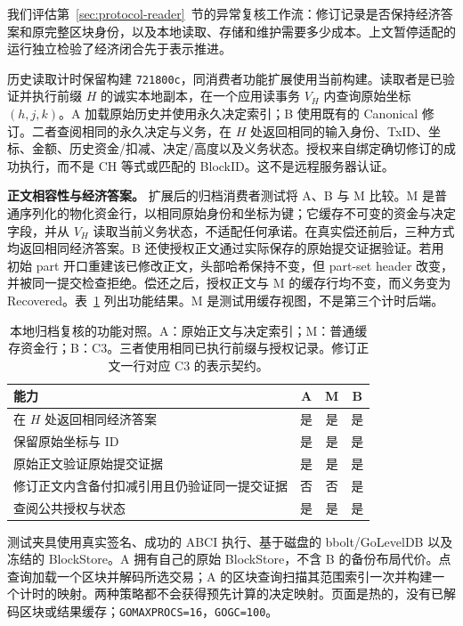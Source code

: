 我们评估第~\ref{sec:protocol-reader}~节的异常复核工作流：修订记录是否保持经济答案和原完整区块身份，以及本地读取、存储和维护需要多少成本。上文暂停适配的运行独立检验了经济闭合先于表示推进。

历史读取计时保留构建 \texttt{721800c}，同消费者功能扩展使用当前构建。读取者是已验证并执行前缀 $H$ 的诚实本地副本，在一个应用读事务 $V_H$ 内查询原始坐标 $(h,j,k)$。A 加载原始历史并使用永久决定索引；B 使用既有的 Canonical 修订。二者查阅相同的永久决定与义务，在 $H$ 处返回相同的输入身份、TxID、坐标、金额、历史资金/扣减、决定/高度以及义务状态。授权来自绑定确切修订的成功执行，而不是 CH 等式或匹配的 BlockID。这不是远程服务器认证。


\noindent\textbf{正文相容性与经济答案。}
扩展后的归档消费者测试将 A、B 与 M 比较。M 是普通序列化的物化资金行，以相同原始身份和坐标为键；它缓存不可变的资金与决定字段，并从 $V_H$ 读取当前义务状态，不适配任何承诺。在真实偿还前后，三种方式均返回相同经济答案。B 还使授权正文通过实际保存的原始提交证据验证。若用初始 part 开口重建该已修改正文，头部哈希保持不变，但 part-set header 改变，并被同一提交检查拒绝。偿还之后，授权正文与 M 的缓存行均不变，而义务变为 Recovered。表~\ref{tab:c3-function} 列出功能结果。M 是测试用缓存视图，不是第三个计时后端。

\begin{table}[t]
  \centering
  \caption{本地归档复核的功能对照。A：原始正文与决定索引；M：普通缓存资金行；B：C3。三者使用相同已执行前缀与授权记录。修订正文一行对应 C3 的表示契约。}
  \label{tab:c3-function}
  \small
  \begin{tabular}{@{}p{}ccc@{}}
    \toprule
    能力 & A & M & B \\
    \midrule
    在 $H$ 处返回相同经济答案 & 是 & 是 & 是 \\
    保留原始坐标与 ID & 是 & 是 & 是 \\
    原始正文验证原始提交证据 & 是 & 是 & 是 \\
    修订正文内含备付扣减引用且仍验证同一提交证据 & 否 & 否 & 是 \\
    查阅公共授权与状态 & 是 & 是 & 是 \\
    \bottomrule
  \end{tabular}
\end{table}

测试夹具使用真实签名、成功的 ABCI 执行、基于磁盘的 bbolt/GoLevelDB 以及冻结的 BlockStore。A 拥有自己的原始 BlockStore，不含 B 的备份布局代价。点查询加载一个区块并解码所选交易；A 的区块查询扫描其范围索引一次并构建一个计时的映射。两种策略都不会获得预先计算的决定映射。页面是热的，没有已解码区块或结果缓存；\texttt{GOMAXPROCS=16}，\texttt{GOGC=100}。

